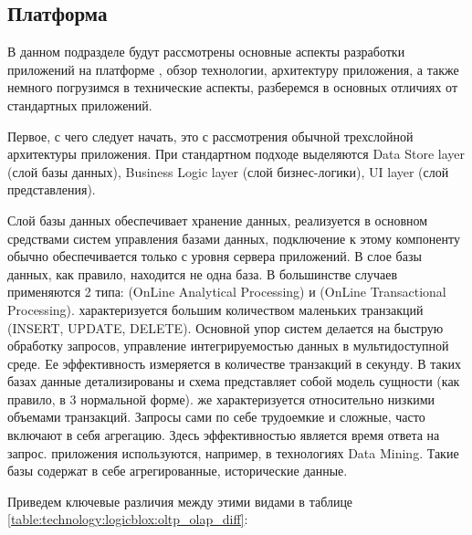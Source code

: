 \subsection{Платформа \LB}
\label{sec:technology:logicblox}

В данном подразделе будут рассмотрены основные аспекты разработки приложений на платформе \LB, обзор технологии, архитектуру приложения, а также немного погрузимся в технические аспекты, разберемся в основных отличиях от стандартных приложений.

Первое, с чего следует начать, это с рассмотрения обычной трехслойной архитектуры приложения. При стандартном подходе выделяются Data Store layer (слой базы данных), Business Logic layer (слой бизнес-логики), UI layer (слой представления).

Слой базы данных обеспечивает хранение данных, реализуется в основном средствами систем управления базами данных, подключение к этому компоненту обычно обеспечивается только с уровня сервера приложений. В слое базы данных, как правило, находится не одна база. В большинстве случаев применяются 2 типа: \olap (OnLine Analytical Processing) и \oltp (OnLine Transactional Processing).
\oltp характеризуется большим количеством маленьких транзакций (INSERT, UPDATE, DELETE). Основной упор \oltp систем делается на быструю обработку запросов, управление интегрируемостью данных в мультидоступной среде. Ее эффективность измеряется в количестве транзакций в секунду. В таких базах данные детализированы и схема представляет собой модель сущности (как правило, в 3 нормальной форме).
\olap же характеризуется относительно низкими объемами транзакций. Запросы сами по себе трудоемкие и сложные, часто включают в себя агрегацию. Здесь эффективностью является время ответа на запрос. \olap приложения используются, например, в технологиях Data Mining. Такие базы содержат в себе агрегированные, исторические данные.

Приведем ключевые различия между этими видами в таблице \ref{table:technology:logicblox:oltp_olap_diff}:

